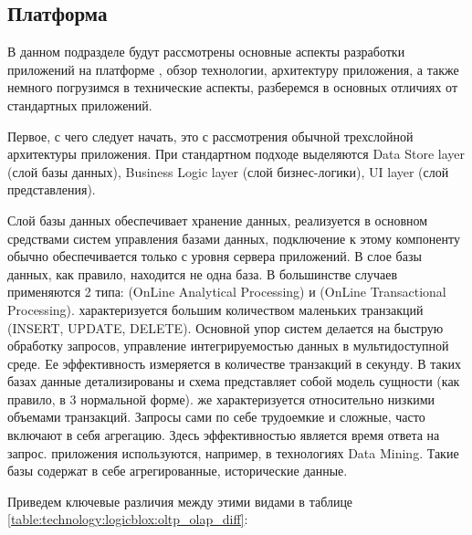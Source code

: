 \subsection{Платформа \LB}
\label{sec:technology:logicblox}

В данном подразделе будут рассмотрены основные аспекты разработки приложений на платформе \LB, обзор технологии, архитектуру приложения, а также немного погрузимся в технические аспекты, разберемся в основных отличиях от стандартных приложений.

Первое, с чего следует начать, это с рассмотрения обычной трехслойной архитектуры приложения. При стандартном подходе выделяются Data Store layer (слой базы данных), Business Logic layer (слой бизнес-логики), UI layer (слой представления).

Слой базы данных обеспечивает хранение данных, реализуется в основном средствами систем управления базами данных, подключение к этому компоненту обычно обеспечивается только с уровня сервера приложений. В слое базы данных, как правило, находится не одна база. В большинстве случаев применяются 2 типа: \olap (OnLine Analytical Processing) и \oltp (OnLine Transactional Processing).
\oltp характеризуется большим количеством маленьких транзакций (INSERT, UPDATE, DELETE). Основной упор \oltp систем делается на быструю обработку запросов, управление интегрируемостью данных в мультидоступной среде. Ее эффективность измеряется в количестве транзакций в секунду. В таких базах данные детализированы и схема представляет собой модель сущности (как правило, в 3 нормальной форме).
\olap же характеризуется относительно низкими объемами транзакций. Запросы сами по себе трудоемкие и сложные, часто включают в себя агрегацию. Здесь эффективностью является время ответа на запрос. \olap приложения используются, например, в технологиях Data Mining. Такие базы содержат в себе агрегированные, исторические данные.

Приведем ключевые различия между этими видами в таблице \ref{table:technology:logicblox:oltp_olap_diff}:

